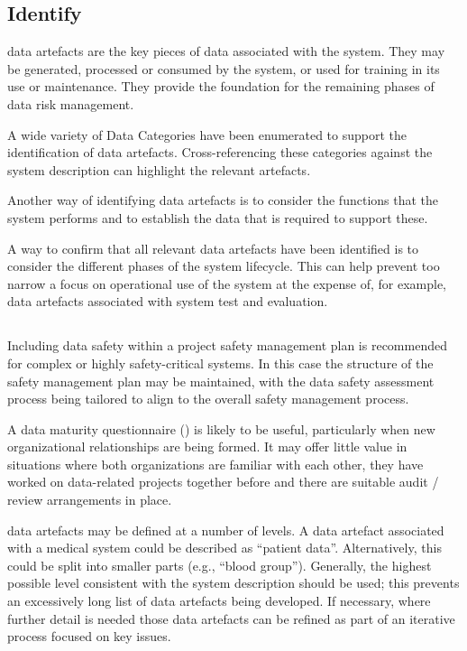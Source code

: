 \subsection{Identify }
\Glspl{data artefact} are the key pieces of data associated with the system. They may be generated, processed or consumed by the system, or used for training in its use or maintenance. They provide the foundation for the remaining phases of data risk management.

A wide variety of Data Categories have been enumerated to support the identification of \glspl{data artefact}. Cross-referencing these categories against the system description can highlight the relevant artefacts. 

Another way of identifying \glspl{data artefact} is to consider the functions that the system performs and to establish the data that is required to support these.

A way to confirm that all relevant \glspl{data artefact} have been identified is to consider the different phases of the system lifecycle. This can help prevent too narrow a focus on operational use of the system at the expense of, for example, \glspl{data artefact} associated with system test and evaluation.

\subsection{}

Including data safety within a project safety management plan is recommended for complex or highly safety-critical systems. In this case the structure of the safety management plan may be maintained, with the \gls{data safety assessment} process being tailored to align to the overall safety management process.

A data maturity questionnaire () is likely to be useful, particularly when new organizational relationships are being formed. It may offer little value in situations where both organizations are familiar with each other, they have worked on data-related projects together before and there are suitable audit / review arrangements in place.

\Glspl{data artefact} may be defined at a number of levels. A \gls{data artefact} associated with a medical system could be described as ``patient data''. Alternatively, this could be split into smaller parts (e.g., ``blood group''). Generally, the highest possible level consistent with the system description should be used; this prevents an excessively long list of \glspl{data artefact} being developed. If necessary, where further detail is needed those \glspl{data artefact} can be refined as part of an iterative process focused on key issues.

